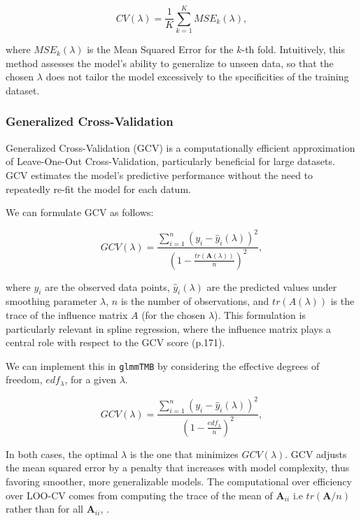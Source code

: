 \documentclass[12pt, twoside,hidelinks]{article}
\theoremstyle{definition}
\numberwithin{equation}{section}
\begin{document}
\begin{equation}
    CV(\lambda) = \frac{1}{K} \sum_{k=1}^{K} MSE_k(\lambda),
    \label{eq:K_fold_CV}
\end{equation}

where \(MSE_k(\lambda)\) is the Mean Squared Error for the \(k\)-th fold. Intuitively, this method assesses the model's ability to generalize to unseen data, so that the chosen \(\lambda\) does not tailor the model excessively to the specificities of the training dataset.

\subsubsection{Generalized Cross-Validation}\label{sec:smooth:lambda:gcv}
Generalized Cross-Validation (GCV) is a computationally efficient approximation of Leave-One-Out Cross-Validation, particularly beneficial for large datasets. GCV estimates the model's predictive performance without the need to repeatedly re-fit the model for each datum. 

We can formulate GCV as follows:

\begin{equation}
    GCV(\lambda) = \frac{\sum_{i=1}^{n} (y_i - \hat{y}_i(\lambda))^2}{(1 - \frac{tr(\mathbf{A}(\lambda))}{n})^2},
    \label{GCV2}
\end{equation}

where \(y_i\) are the observed data points, \(\hat{y}_i(\lambda)\) are the predicted values under smoothing parameter \(\lambda\), \(n\) is the number of observations, and \(tr(A(\lambda))\) is the trace of the influence matrix \(A\) (for the chosen \(\lambda\)). This formulation is particularly relevant in spline regression, where the influence matrix plays a central role with respect to the GCV score \citet{wood2017} (p.171).
\newline

We can implement this in \texttt{glmmTMB} by considering the effective degrees of freedom, \(edf_{\lambda}\), for a given \(\lambda\).

\begin{equation}
    GCV(\lambda) = \frac{\sum_{i=1}^{n} (y_i - \hat{y}_i(\lambda))^2}{(1 - \frac{edf_{\lambda}}{n})^2},
    \label{GCV1}
\end{equation}

In both cases, the optimal \(\lambda\) is the one that minimizes \(GCV(\lambda)\). GCV adjusts the mean squared error by a penalty that increases with model complexity, thus favoring smoother, more generalizable models. The computational over efficiency over LOO-CV comes from computing the trace of the mean of \(\mathbf{A}_{ii}\) i.e $tr (\mathbf{A} / n )$ rather than for all $\mathbf{A}_{ii}$, \citep{wood2017}. 
\newline
\end{document}
